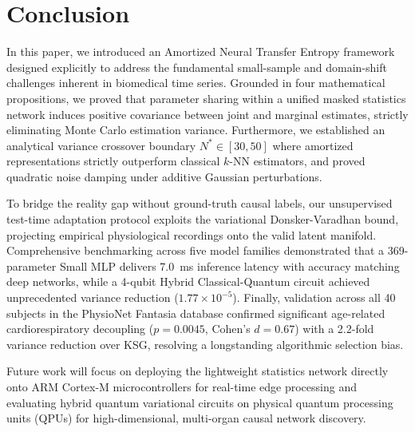 \section{Conclusion}
In this paper, we introduced an Amortized Neural Transfer Entropy framework designed explicitly to address the fundamental small-sample and domain-shift challenges inherent in biomedical time series. Grounded in four mathematical propositions, we proved that parameter sharing within a unified masked statistics network induces positive covariance between joint and marginal estimates, strictly eliminating Monte Carlo estimation variance. Furthermore, we established an analytical variance crossover boundary $N^* \in [30, 50]$ where amortized representations strictly outperform classical $k$-NN estimators, and proved quadratic noise damping under additive Gaussian perturbations.

To bridge the reality gap without ground-truth causal labels, our unsupervised test-time adaptation protocol exploits the variational Donsker-Varadhan bound, projecting empirical physiological recordings onto the valid latent manifold. Comprehensive benchmarking across five model families demonstrated that a 369-parameter Small MLP delivers 7.0~ms inference latency with accuracy matching deep networks, while a 4-qubit Hybrid Classical-Quantum circuit achieved unprecedented variance reduction ($1.77 \times 10^{-5}$). Finally, validation across all 40 subjects in the PhysioNet Fantasia database confirmed significant age-related cardiorespiratory decoupling ($p = 0.0045$, Cohen's $d = 0.67$) with a 2.2-fold variance reduction over KSG, resolving a longstanding algorithmic selection bias.

Future work will focus on deploying the lightweight statistics network directly onto ARM Cortex-M microcontrollers for real-time edge processing and evaluating hybrid quantum variational circuits on physical quantum processing units (QPUs) for high-dimensional, multi-organ causal network discovery.
